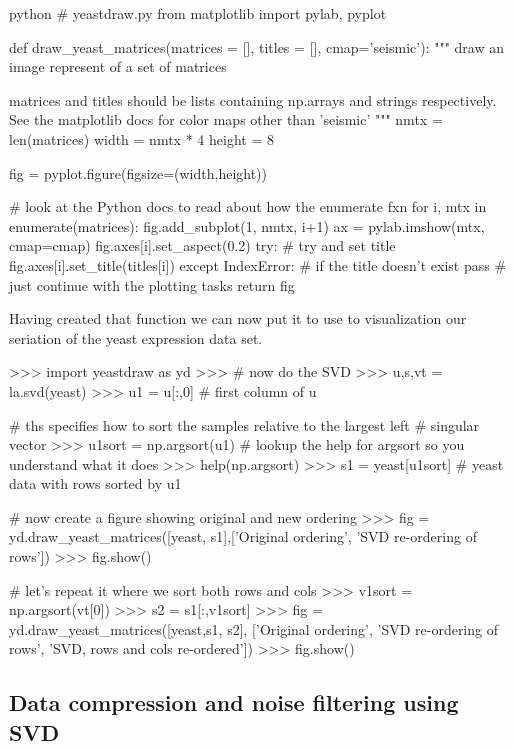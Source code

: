 \documentclass[11pt,letterpaper]{article}
\begin{document}
\begin{PageCode}{python}
# yeastdraw.py
from matplotlib import pylab, pyplot

def draw_yeast_matrices(matrices = [], titles = [], cmap='seismic'):
    """ draw an image represent of a set of matrices
    
    matrices and titles should be lists containing np.arrays and strings
    respectively. See the matplotlib docs for color maps other than 'seismic'
    """
    nmtx = len(matrices)
    width = nmtx * 4
    height = 8
    
    fig = pyplot.figure(figsize=(width,height))
    
    # look at the Python docs to read about how the enumerate fxn
    for i, mtx in enumerate(matrices):
        fig.add_subplot(1, nmtx, i+1)
        ax = pylab.imshow(mtx, cmap=cmap)
        fig.axes[i].set_aspect(0.2)
        try:  # try and set title
            fig.axes[i].set_title(titles[i])
        except IndexError:  # if the title doesn't exist
            pass            # just continue with the plotting tasks
    return fig
    
\end{PageCode}

Having created that function we can now put it to use to visualization our seriation of the yeast expression data set.


\begin{Pcode}
>>> import yeastdraw as yd    
>>> # now do the SVD   
>>> u,s,vt = la.svd(yeast)
>>> u1 = u[:,0] # first column of u

# ths specifies how to sort the samples relative to the largest left 
# singular vector
>>> u1sort = np.argsort(u1) 
# lookup the help for argsort so you understand what it does
>>> help(np.argsort)  
>>> s1 = yeast[u1sort] # yeast data with rows sorted by u1

# now create a figure showing original and new ordering
>>> fig = yd.draw_yeast_matrices([yeast, s1],['Original ordering',
                                             'SVD re-ordering of rows'])
>>> fig.show()

# let's repeat it where we sort both rows and cols
>>> v1sort = np.argsort(vt[0])
>>> s2 = s1[:,v1sort]
>>> fig = yd.draw_yeast_matrices([yeast,s1, s2],
        ['Original ordering', 'SVD re-ordering of rows',
        'SVD, rows and cols re-ordered'])
>>> fig.show()
\end{Pcode}

\subsection*{Data compression and noise filtering using SVD}
\end{document}
